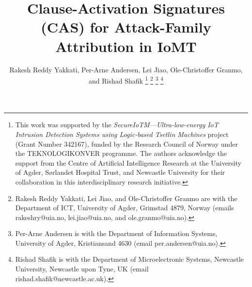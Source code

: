 \documentclass[conference]{IEEEtran}
\begin{document}
\title{Clause-Activation Signatures (CAS) for Attack-Family Attribution in IoMT}

\author{Rakesh Reddy Yakkati, Per-Arne Andersen, Lei Jiao, Ole-Christoffer Granmo, and Rishad Shafik
\thanks{This work was supported by the \textit{SecureIoTM---Ultra-low-energy IoT Intrusion Detection Systems using Logic-based Tsetlin Machines} project (Grant Number 342167), funded by the Research Council of Norway under the TEKNOLOGIKONVER programme. The authors acknowledge the support from the Centre of Artificial Intelligence Research at the University of Agder, Sørlandet Hospital Trust, and Newcastle University for their collaboration in this interdisciplinary research initiative.}%
\thanks{Rakesh Reddy Yakkati, Lei Jiao, and Ole-Christoffer Granmo are with the Department of ICT, University of Agder, Grimstad 4879, Norway (emails rakeshry@uia.no, lei.jiao@uia.no, and ole.granmo@uia.no).}
\thanks{Per-Arne Andersen is with the Department of Information Systems, University of Agder, Kristiansand 4630 (email per.andersen@uia.no).}
\thanks{Rishad Shafik is with the Department of Microelectronic Systems, Newcastle University, Newcastle upon Tyne, UK (email rishad.shafik@newcastle.ac.uk).}}

\maketitle
\end{document}
